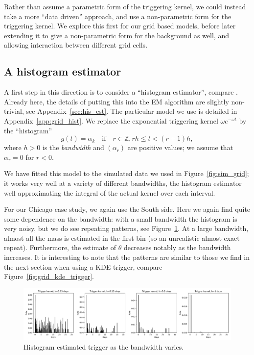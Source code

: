 \documentclass[twoside,a4paper]{article}
\theoremstyle{plain}
\theoremstyle{definition}
\begin{document}
Rather than assume a parametric form of the triggering kernel, we could instead take a more
``data driven'' approach, and use a non-parametric form for the triggering kernel.  We
explore this first for our grid based models, before later extending it to give a non-parametric
form for the background as well, and allowing interaction between different grid cells.




\subsection{A histogram estimator}

A first step in this direction is to consider a ``histogram estimator'', compare
\cite[Section~2.2]{sil}.  Already here, the details of putting this into the EM algorithm
are slightly non-trivial, see Appendix~\ref{sec:his_est}.  The particular model we use
is detailed in Appendix~\ref{app:grid_hist}.  We replace the exponential triggering kernel
$\omega e^{-\omega t}$ by the ``histogram''
\[ g(t) = \alpha_k \quad\text{if}\quad r\in\mathbb Z, rh \leq t < (r+1)h, \]
where $h>0$ is the \emph{bandwidth} and $(\alpha_r)$ are positive values; we assume
that $\alpha_r = 0$ for $r<0$.

We have fitted this model to the simulated data we used in Figure~\ref{fig:sim_grid};
it works very well at a variety of different bandwidths, the histogram estimator well
approximating the integral of the actual kernel over each interval.

For our Chicago case study, we again use the South side.  Here we again find quite some
dependence on the bandwidth: with a small bandwidth the histogram is very noisy, but we
do see repeating patterns, see Figure~\ref{fig:south_trigger}.
At a large bandwidth, almost all the mass is estimated in the
first bin (so an unrealistic almost exact repeat).  Furthermore, the estimate of $\theta$
decreases notably as the bandwidth increases.
It is interesting to note that the patterns are similar to those we find in the next
section when using a KDE trigger, compare Figure~\ref{fig:grid_kde_trigger}.

\begin{figure}
  \includegraphics[width=\textwidth]{../notebooks/south_trigger.pdf}
  \caption{Histogram estimated trigger as the bandwidth varies.}
  \label{fig:south_trigger}
\end{figure}
\end{document}
